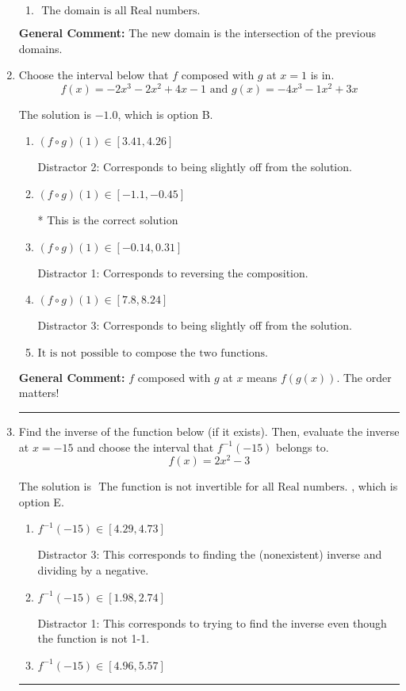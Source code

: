 \documentclass{extbook}[14pt]
\newcommand{\litem}[1]{\item #1

\rule{\textwidth}{0.4pt}}
\begin{document}
\begin{enumerate}
{\begin{enumerate}[label=\Alph*.]
\item \( \text{ The domain is all Real numbers. } \)


\end{enumerate}

\textbf{General Comment:} The new domain is the intersection of the previous domains.
}
\litem{
Choose the interval below that $f$ composed with $g$ at $x=1$ is in.
\[ f(x) = -2x^{3} -2 x^{2} +4 x -1 \text{ and } g(x) = -4x^{3} -1 x^{2} +3 x \]

The solution is \( -1.0 \), which is option B.\begin{enumerate}[label=\Alph*.]
\item \( (f \circ g)(1) \in [3.41, 4.26] \)

 Distractor 2: Corresponds to being slightly off from the solution.
\item \( (f \circ g)(1) \in [-1.1, -0.45] \)

* This is the correct solution
\item \( (f \circ g)(1) \in [-0.14, 0.31] \)

 Distractor 1: Corresponds to reversing the composition.
\item \( (f \circ g)(1) \in [7.8, 8.24] \)

 Distractor 3: Corresponds to being slightly off from the solution.
\item \( \text{It is not possible to compose the two functions.} \)


\end{enumerate}

\textbf{General Comment:} $f$ composed with $g$ at $x$ means $f(g(x))$. The order matters!
}
\litem{
Find the inverse of the function below (if it exists). Then, evaluate the inverse at $x = -15$ and choose the interval that $f^{-1}(-15)$ belongs to.
\[ f(x) = 2 x^2 - 3 \]

The solution is \( \text{ The function is not invertible for all Real numbers. } \), which is option E.\begin{enumerate}[label=\Alph*.]
\item \( f^{-1}(-15) \in [4.29, 4.73] \)

 Distractor 3: This corresponds to finding the (nonexistent) inverse and dividing by a negative.
\item \( f^{-1}(-15) \in [1.98, 2.74] \)

 Distractor 1: This corresponds to trying to find the inverse even though the function is not 1-1. 
\item \( f^{-1}(-15) \in [4.96, 5.57] \)


\end{enumerate}}
\end{enumerate}
\end{document}
